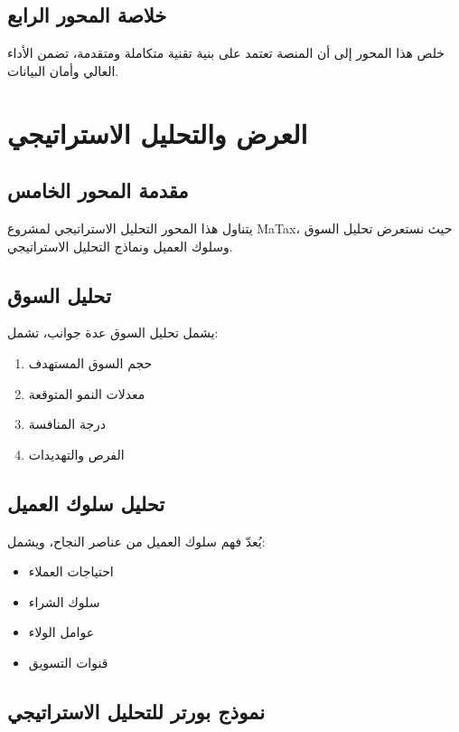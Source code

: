 \documentclass[12pt, a4paper, twoside]{report}
\begin{document}
\section{خلاصة المحور الرابع}

خلص هذا المحور إلى أن المنصة تعتمد على بنية تقنية متكاملة ومتقدمة، تضمن الأداء العالي وأمان البيانات.

\newpage

\chapter{العرض والتحليل الاستراتيجي}

\section{مقدمة المحور الخامس}

يتناول هذا المحور التحليل الاستراتيجي لمشروع MaTax، حيث نستعرض تحليل السوق وسلوك العميل ونماذج التحليل الاستراتيجي.

\section{تحليل السوق}

يشمل تحليل السوق عدة جوانب، تشمل:
\begin{enumerate}
    \item حجم السوق المستهدف
    \item معدلات النمو المتوقعة
    \item درجة المنافسة
    \item الفرص والتهديدات
\end{enumerate}

\section{تحليل سلوك العميل}

يُعدّ فهم سلوك العميل من عناصر النجاح، ويشمل:
\begin{itemize}
    \item احتياجات العملاء
    \item سلوك الشراء
    \item عوامل الولاء
    \item قنوات التسويق
\end{itemize}

\section{نموذج بورتر للتحليل الاستراتيجي}
\end{document}
